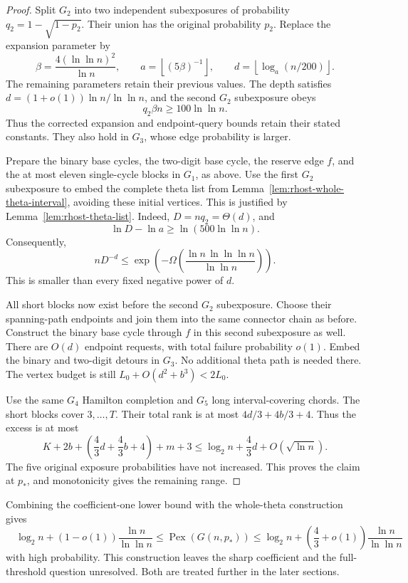 \begin{proof}
Split $G_2$ into two independent subexposures of probability
$q_2=1-\sqrt{1-p_2}$.
Their union has the original probability $p_2$.
Replace the expansion parameter by
\[
 \beta=\frac{4(\ln\ln n)^2}{\ln n},\qquad
 a=\left\lfloor(5\beta)^{-1}\right\rfloor,
 \qquad d=\left\lfloor\log_a(n/200)\right\rfloor.
\]
The remaining parameters retain their previous values.
The depth satisfies $d=(1+o(1))\ln n/\ln\ln n$, and the second $G_2$ subexposure obeys
\[
 q_2\beta n\ge100\ln\ln n.
\]
Thus the corrected expansion and endpoint-query bounds retain their stated constants.
They also hold in $G_3$, whose edge probability is larger.

Prepare the binary base cycles, the two-digit base cycle, the reserve edge $f$,
and the at most eleven single-cycle blocks in $G_1$, as above.
Use the first $G_2$ subexposure to embed the complete theta list from
Lemma~\ref{lem:rhost-whole-theta-interval}, avoiding these initial vertices.
This is justified by Lemma~\ref{lem:rhost-theta-list}.
Indeed, $D=nq_2=\Theta(d)$, and
\[
 \ln D-\ln a\ge\ln(500\ln\ln n).
\]
Consequently,
\[
 nD^{-d}
 \le\exp\!\left(-\Omega\!\left(
 \frac{\ln n\,\ln\ln\ln n}{\ln\ln n}\right)\right).
\]
This is smaller than every fixed negative power of $d$.

All short blocks now exist before the second $G_2$ subexposure.
Choose their spanning-path endpoints and join them into the same connector chain as before.
Construct the binary base cycle through $f$ in this second subexposure as well.
There are $O(d)$ endpoint requests, with total failure probability $o(1)$.
Embed the binary and two-digit detours in $G_3$.
No additional theta path is needed there.
The vertex budget is still $L_0+O(d^2+b^3)<2L_0$.

Use the same $G_4$ Hamilton completion and $G_5$ long interval-covering chords.
The short blocks cover $3,\ldots,T$.
Their total rank is at most $4d/3+4b/3+4$.
Thus the excess is at most
\[
 K+2b+\left(\frac43d+\frac43b+4\right)+m+3
 \le\log_2n+\frac43d+O(\sqrt{\ln n}).
\]
The five original exposure probabilities have not increased.
This proves the claim at $p_*$, and monotonicity gives the remaining range.
\end{proof}

Combining the coefficient-one lower bound with the whole-theta construction gives
\[
 \boxed{\quad
 \log_2n+(1-o(1))\frac{\ln n}{\ln\ln n}
 \le\operatorname{Pex}(G(n,p_*))
 \le\log_2n+\left(\frac43+o(1)\right)\frac{\ln n}{\ln\ln n}
 \quad}
\]
with high probability.
This construction leaves the sharp coefficient and the full-threshold question unresolved.
Both are treated further in the later sections.
